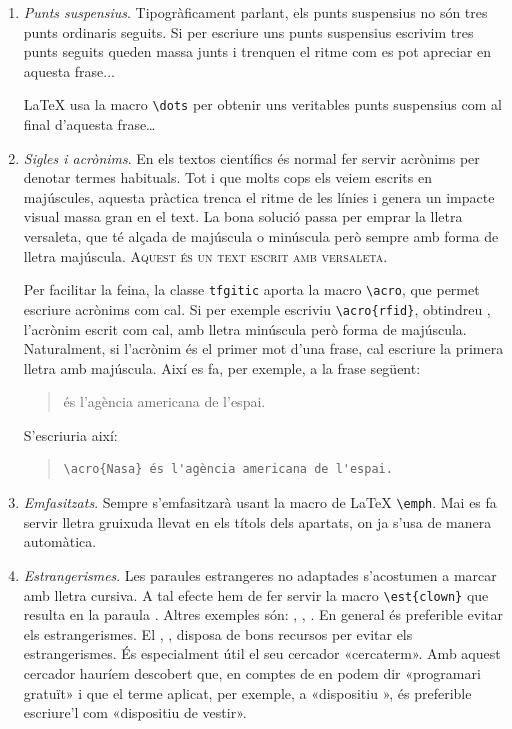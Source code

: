 \documentclass{tfgitic}[2024/07/01]
\begin{document}
\begin{enumerate}
\item \emph{Punts suspensius}. Tipogràficament parlant, els punts
  suspensius no són tres punts ordinaris seguits. Si per escriure uns
  punts suspensius escrivim tres punts seguits queden massa junts i
  trenquen el ritme com es pot apreciar en aquesta frase...

  \LaTeX{} usa la macro \verb!\dots! per obtenir uns veritables punts
  suspensius com al final d'aquesta frase\dots

\item \emph{Sigles i acrònims}. En els textos científics és normal fer
  servir acrònims per denotar termes habituals. Tot i que molts cops
  els veiem escrits en majúscules, aquesta pràctica trenca el ritme de
  les línies i genera un impacte visual massa gran en el text. La bona
  solució passa per emprar la lletra versaleta, que té alçada de
  majúscula o minúscula però sempre amb forma de lletra
  majúscula. \textsc{Aquest és un text escrit amb versaleta}.

  Per facilitar la feina, la classe \texttt{tfgitic} aporta la macro
  \verb!\acro!, que permet escriure acrònims com cal. Si per exemple
  escriviu \verb!\acro{rfid}!, obtindreu , l'acrònim escrit
  com cal, amb lletra minúscula però forma de majúscula. Naturalment,
  si l'acrònim és el primer mot d'una frase, cal escriure la primera
  lletra amb majúscula. Així es fa, per exemple, a la frase següent:
  \begin{quote}
     és l'agència americana de l'espai.
  \end{quote}
  S'escriuria així:
  \begin{quote}
\begin{verbatim}
\acro{Nasa} és l'agència americana de l'espai.
\end{verbatim}
  \end{quote}

\item \emph{Emfasitzats}. Sempre s'emfasitzarà usant la macro de
  \LaTeX{} \verb!\emph!. Mai es fa servir lletra gruixuda llevat en
  els títols dels apartats, on ja s'usa de manera automàtica.

\item \emph{Estrangerismes}. Les paraules estrangeres no adaptades
  s'acostumen a marcar amb lletra cursiva. A tal efecte hem de fer
  servir la macro \verb|\est{clown}| que resulta en la paraula
  . Altres exemples són: , ,
  . En general és preferible evitar els
  estrangerismes. El , \cite{termcat18:_web_termc},
  disposa de bons recursos per evitar els estrangerismes. És
  especialment útil el seu cercador «cercaterm». Amb aquest cercador
  hauríem descobert que, en comptes de  en podem dir
  «programari gratuït» i que el terme  aplicat, per
  exemple, a «dispositiu », és preferible escriure'l com
  «dispositiu de vestir».


\end{enumerate}
\end{document}
